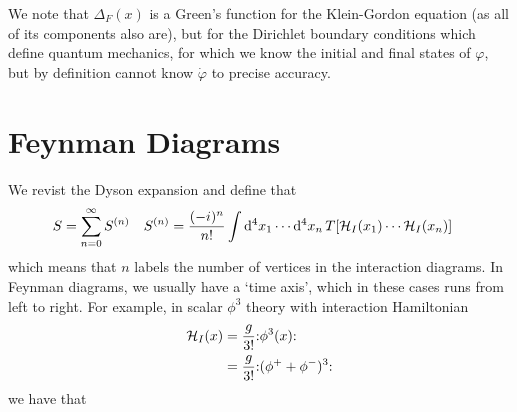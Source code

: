 \documentclass[notes.tex]{subfiles}
\begin{document}
We note that $\Delta_F(x)$ is a Green's function for the Klein-Gordon equation (as all of its components also are), but for the Dirichlet boundary conditions which define quantum mechanics, for which we know the initial and final states of $\varphi$, but by definition cannot know $\dot\varphi$ to precise accuracy.

\section{Feynman Diagrams}
We revist the Dyson expansion and define that
\begin{align*}
	S&=\sum_{n=0}^\infty S^{(n)} & S^{(n)} &= \frac{(-i)^n}{n!} \int\dd[4]{x_1}\cdots\dd[4]{x_n} T\qty[\mathcal{H}_I(x_1)\cdots \mathcal{H}_I(x_n)]
\end{align*}
which means that $n$ labels the number of vertices in the interaction diagrams.
In Feynman diagrams, we usually have a `time axis', which in these cases runs from left to right.
For example, in scalar $\phi^3$ theory with interaction Hamiltonian
\begin{align*}
	\mathcal{H}_I (x) &= \frac{g}{3!} \mathbf{:}\phi^3(x)\mathbf{:}\\
	&= \frac{g}{3!}\mathbf{:}(\phi^+ + \phi^-)^3\mathbf{:}
\end{align*}
we have that
\end{document}
